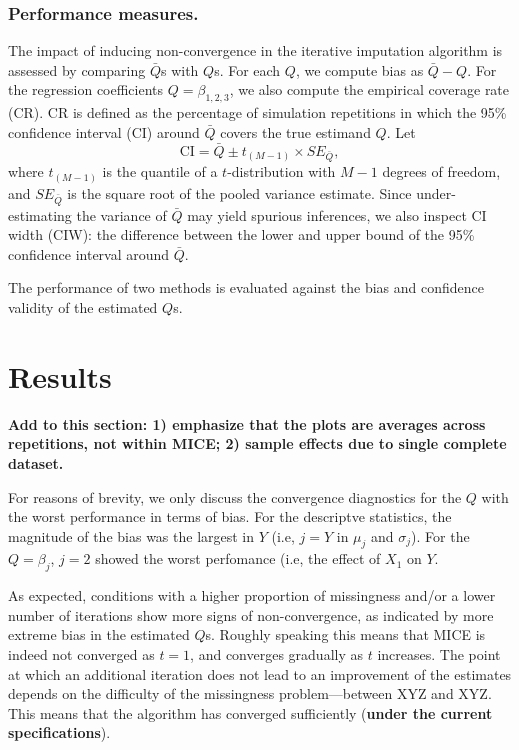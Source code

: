 \documentclass[Royal,times,sageh]{sagej}
\begin{document}
\hypertarget{performance-measures.}{%
\subsubsection{Performance measures.}\label{performance-measures.}}

The impact of inducing non-convergence in the iterative imputation
algorithm is assessed by comparing \(\bar{Q}\)s with \(Q\)s. For each
\(Q\), we compute bias as \(\bar{Q} - Q\). For the regression
coefficients \(Q=\beta_{1,2,3}\), we also compute the empirical coverage
rate (CR). CR is defined as the percentage of simulation repetitions in
which the 95\% confidence interval (CI) around \(\bar{Q}\) covers the
true estimand \(Q\). Let
\[\text{CI} = \bar{Q} \pm t_{(M-1)} \times SE_{\bar{Q}},\] where
\(t_{(M-1)}\) is the quantile of a \(t\)-distribution with \(M-1\)
degrees of freedom, and \(SE_{\bar{Q}}\) is the square root of the
pooled variance estimate. Since under-estimating the variance of
\(\bar{Q}\) may yield spurious inferences, we also inspect CI width
(CIW): the difference between the lower and upper bound of the 95\%
confidence interval around \(\bar{Q}\).

The performance of two methods is evaluated against the bias and
confidence validity of the estimated \(Q\)s.

\hypertarget{results}{%
\section{Results}\label{results}}

\textbf{Add to this section: 1) emphasize that the plots are averages
across repetitions, not within MICE; 2) sample effects due to single
complete dataset.}

For reasons of brevity, we only discuss the convergence diagnostics for
the \(Q\) with the worst performance in terms of bias. For the
descriptve statistics, the magnitude of the bias was the largest in
\(Y\) (i.e, \(j = Y\) in \(\mu_j\) and \(\sigma_j\)). For the
\(Q=\beta_j\), \(j=2\) showed the worst perfomance (i.e, the effect of
\(X_1\) on \(Y\).

As expected, conditions with a higher proportion of missingness and/or a
lower number of iterations show more signs of non-convergence, as
indicated by more extreme bias in the estimated \(Q\)s. Roughly speaking
this means that MICE is indeed not converged as \(t=1\), and converges
gradually as \(t\) increases. The point at which an additional iteration
does not lead to an improvement of the estimates depends on the
difficulty of the missingness problem---between XYZ and XYZ. This means
that the algorithm has converged sufficiently (\textbf{under the current
specifications}).
\end{document}
